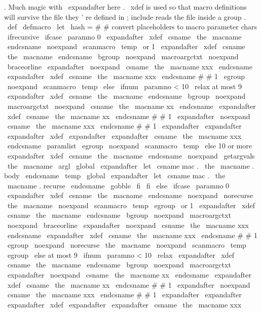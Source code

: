 {{{{.
%
Much
magic
with
\
expandafter
here
.
%
\
xdef
is
used
so
that
macro
definitions
will
survive
the
file
%
they
'
re
defined
in
;
include
reads
the
file
inside
a
group
.
%
\
def
\
defmacro
{
%
\
let
\
hash
=
#
#
%
convert
placeholders
to
macro
parameter
chars
\
ifrecursive
\
ifcase
\
paramno
%
0
\
expandafter
\
xdef
\
csname
\
the
\
macname
\
endcsname
{
%
\
noexpand
\
scanmacro
{
\
temp
}
}
%
\
or
%
1
\
expandafter
\
xdef
\
csname
\
the
\
macname
\
endcsname
{
%
\
bgroup
\
noexpand
\
macroargctxt
\
noexpand
\
braceorline
\
expandafter
\
noexpand
\
csname
\
the
\
macname
xxx
\
endcsname
}
%
\
expandafter
\
xdef
\
csname
\
the
\
macname
xxx
\
endcsname
#
#
1
{
%
\
egroup
\
noexpand
\
scanmacro
{
\
temp
}
}
%
\
else
\
ifnum
\
paramno
<
10
\
relax
%
at
most
9
\
expandafter
\
xdef
\
csname
\
the
\
macname
\
endcsname
{
%
\
bgroup
\
noexpand
\
macroargctxt
\
noexpand
\
csname
\
the
\
macname
xx
\
endcsname
}
%
\
expandafter
\
xdef
\
csname
\
the
\
macname
xx
\
endcsname
#
#
1
{
%
\
expandafter
\
noexpand
\
csname
\
the
\
macname
xxx
\
endcsname
#
#
1
}
%
\
expandafter
\
expandafter
\
expandafter
\
xdef
\
expandafter
\
expandafter
\
csname
\
the
\
macname
xxx
\
endcsname
\
paramlist
{
\
egroup
\
noexpand
\
scanmacro
{
\
temp
}
}
%
\
else
%
10
or
more
\
expandafter
\
xdef
\
csname
\
the
\
macname
\
endcsname
{
%
\
noexpand
\
getargvals
{
\
the
\
macname
}
{
\
argl
}
%
}
%
\
global
\
expandafter
\
let
\
csname
mac
.
\
the
\
macname
.
body
\
endcsname
\
temp
\
global
\
expandafter
\
let
\
csname
mac
.
\
the
\
macname
.
recurse
\
endcsname
\
gobble
\
fi
\
fi
\
else
\
ifcase
\
paramno
%
0
\
expandafter
\
xdef
\
csname
\
the
\
macname
\
endcsname
{
%
\
noexpand
\
norecurse
{
\
the
\
macname
}
%
\
noexpand
\
scanmacro
{
\
temp
}
\
egroup
}
%
\
or
%
1
\
expandafter
\
xdef
\
csname
\
the
\
macname
\
endcsname
{
%
\
bgroup
\
noexpand
\
macroargctxt
\
noexpand
\
braceorline
\
expandafter
\
noexpand
\
csname
\
the
\
macname
xxx
\
endcsname
}
%
\
expandafter
\
xdef
\
csname
\
the
\
macname
xxx
\
endcsname
#
#
1
{
%
\
egroup
\
noexpand
\
norecurse
{
\
the
\
macname
}
%
\
noexpand
\
scanmacro
{
\
temp
}
\
egroup
}
%
\
else
%
at
most
9
\
ifnum
\
paramno
<
10
\
relax
\
expandafter
\
xdef
\
csname
\
the
\
macname
\
endcsname
{
%
\
bgroup
\
noexpand
\
macroargctxt
\
expandafter
\
noexpand
\
csname
\
the
\
macname
xx
\
endcsname
}
%
\
expandafter
\
xdef
\
csname
\
the
\
macname
xx
\
endcsname
#
#
1
{
%
\
expandafter
\
noexpand
\
csname
\
the
\
macname
xxx
\
endcsname
#
#
1
}
%
\
expandafter
\
expandafter
\
expandafter
\
xdef
\
expandafter
\
expandafter
\
csname
\
the
\
macname
xxx
}}}}}
